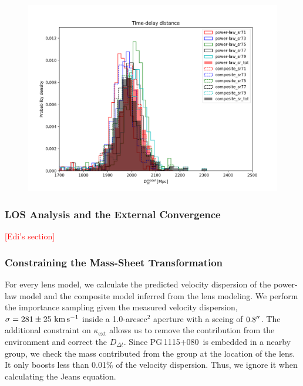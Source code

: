 \documentclass[useAMS,usenatbib]{mnras}
\newcommand\todo[1]{\textcolor{red}{#1}}
\newcommand\pg{PG\,1115$+$080}
\def\kms {\rm km\,s^{-1}}
\newcommand{\Ddt}{D_{\Delta t}}
\begin{document}
\begin{figure}
\centering
\includegraphics[scale=0.8]{RXJ1131_Ddt.png}
\caption{}
\label{fig:RXJ1131_Ddt}
\end{figure}
\subsubsection{LOS Analysis and the External Convergence}
\todo{[Edi's section]}

\subsubsection{Constraining the Mass-Sheet Transformation}
For every lens model, we calculate the predicted velocity dispersion of the power-law model and the composite model inferred from the lens modeling. We perform the importance sampling given the measured velocity dispersion, $\sigma=281\pm25~\kms$ \citep{Tonry98} inside a 1.0-arcsec$^{2}$ aperture with a seeing of $0.8\hbox{$^{\prime\prime}$}$. The additional constraint on $\kappa_{\textrm{ext}}$ allows us to remove the contribution from the environment and correct the $\Ddt$. Since \pg~is embedded in a nearby group, we check the mass contributed from the group at the location of the lens. It only boosts less than 0.01\% of the velocity dispersion. Thus, we ignore it when calculating the Jeans equation. 
\end{document}
